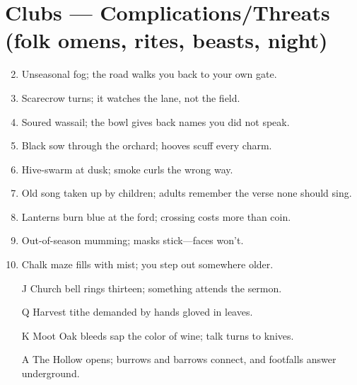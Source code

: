 \section*{Clubs --- Complications/Threats (folk omens, rites, beasts, night)}
\label{sec:aelaerem-complications}
\begin{enumerate}
\setcounter{enumi}{1}
\item Unseasonal fog; the road walks you back to your own gate.
\item Scarecrow turns; it watches the lane, not the field.
\item Soured wassail; the bowl gives back names you did not speak.
\item Black sow through the orchard; hooves scuff every charm.
\item Hive-swarm at dusk; smoke curls the wrong way.
\item Old song taken up by children; adults remember the verse none should sing.
\item Lanterns burn blue at the ford; crossing costs more than coin.
\item Out-of-season mumming; masks stick---faces won't.
\item Chalk maze fills with mist; you step out somewhere older.
\item[J] Church bell rings thirteen; something attends the sermon.
\item[Q] Harvest tithe demanded by hands gloved in leaves.
\item[K] Moot Oak bleeds sap the color of wine; talk turns to knives.
\item[A] The Hollow opens; burrows and barrows connect, and footfalls answer underground.
\end{enumerate}

